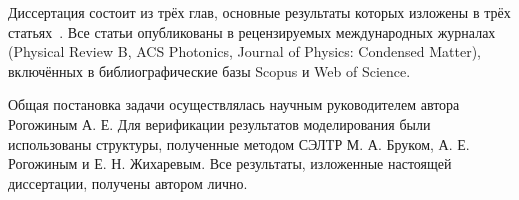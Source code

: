 Диссертация состоит из трёх глав, основные результаты которых изложены в трёх статьях~\cite{my_graphene,my_HgCdTe,my_plasmon}. Все статьи опубликованы в рецензируемых международных журналах (Physical Review B, ACS Photonics, Journal of Physics: Condensed Matter), включённых в библиографические базы Scopus и Web of Science.
    
\contribution Общая постановка задачи осуществлялась научным руководителем автора Рогожиным А. Е. Для верификации результатов моделирования были использованы структуры, полученные методом СЭЛТР М. А. Бруком, А. Е. Рогожиным и Е. Н. Жихаревым. Все результаты, изложенные настоящей диссертации, получены автором лично.